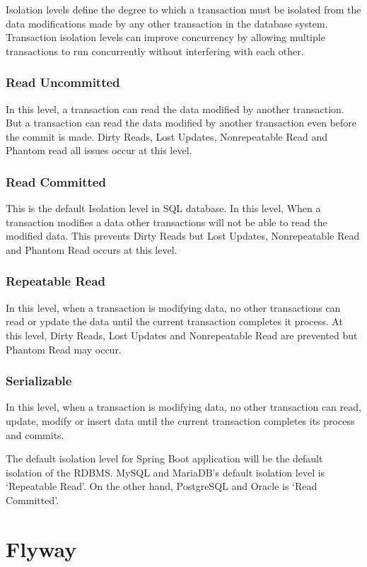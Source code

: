 Isolation levels define the degree to which a transaction must be isolated from the data modifications made by any other transaction in the database system. 
Transaction isolation levels can improve concurrency by allowing multiple transactions to run concurrently without interfering with each other.


\subsubsection{Read Uncommitted}
In this level, a transaction can read the data modified by another transaction. But a transaction can read the data modified by another transaction even before the commit is made. Dirty Reads, Lost Updates, Nonrepeatable Read and Phantom read all issues occur at this level.

\subsubsection{Read Committed}
This is the default Isolation level in SQL database. In this level, When a transaction modifies a data other transactions will not be able to read the modified data. This prevents Dirty Reads but Lost Updates, Nonrepeatable Read and Phantom Read occurs at this level.

\subsubsection{Repeatable Read}
In this level, when a transaction is modifying data, no other transactions can read or ypdate the data until the current transaction completes it process. At this level, Dirty Reads, Lost Updates and Nonrepeatable Read are prevented but Phantom Read may occur.

\subsubsection{Serializable}
In this level, when a transaction is modifying data, no other transaction can read, update, modify or insert data until the current transaction completes its process and commits.


The default isolation level for Spring Boot application will be the default isolation of the RDBMS. MySQL and MariaDB's default isolation level is `Repeatable Read'. On the other hand, PostgreSQL and Oracle is `Read Committed'.


\section{Flyway}

